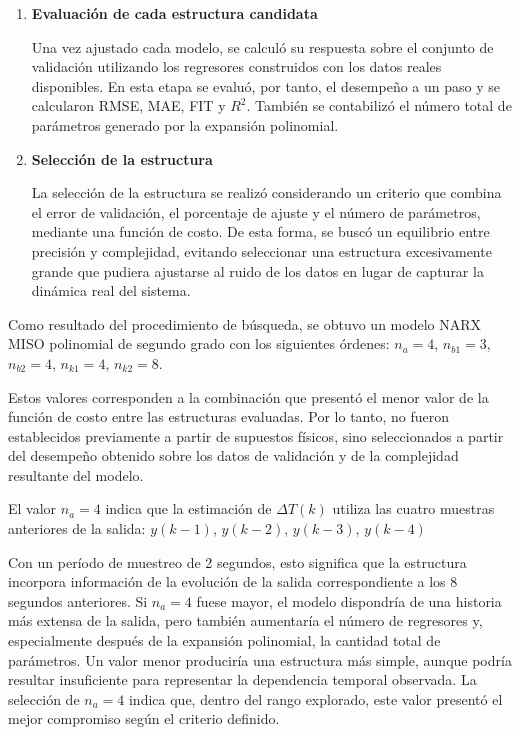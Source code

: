 \documentclass[11pt]{report}
\begin{document}
\begin{enumerate}
\item \textbf{Evaluación de cada estructura candidata}

Una vez ajustado cada modelo, se calculó su respuesta sobre el conjunto de validación utilizando los regresores construidos con los datos reales disponibles. En esta etapa se evaluó, por tanto, el desempeño a un paso y se calcularon RMSE, MAE, FIT y $R^2$. También se contabilizó el número total de parámetros generado por la expansión polinomial.


\item \textbf{Selección de la estructura}

La selección de la estructura se realizó considerando un criterio que combina el error de validación, el porcentaje de ajuste y el número de parámetros, mediante una función de costo. De esta forma, se buscó un equilibrio entre precisión y complejidad, evitando seleccionar una estructura excesivamente grande que pudiera ajustarse al ruido de los datos en lugar de capturar la dinámica real del sistema.

    
\end{enumerate}





Como resultado del procedimiento de búsqueda, se obtuvo un modelo NARX MISO polinomial de segundo grado con los siguientes órdenes: $n_a=4$, $n_{b1}=3$, $n_{b2}=4$, $n_{k1}=4$, $n_{k2}=8$.

Estos valores corresponden a la combinación que presentó el menor valor de la función de costo entre las estructuras evaluadas. Por lo tanto, no fueron establecidos previamente a partir de supuestos físicos, sino seleccionados a partir del desempeño obtenido sobre los datos de validación y de la complejidad resultante del modelo.


El valor $n_a=4$ indica que la estimación de $\Delta T(k)$ utiliza las cuatro muestras anteriores de la salida: $y(k-1)$, $y(k-2)$, $y(k-3)$, $y(k-4)$

Con un período de muestreo de 2 segundos, esto significa que la estructura incorpora información de la evolución de la salida correspondiente a los 8 segundos anteriores. Si $n_a=4$ fuese mayor, el modelo dispondría de una historia más extensa de la salida, pero también aumentaría el número de regresores y, especialmente después de la expansión polinomial, la cantidad total de parámetros. Un valor menor produciría una estructura más simple, aunque podría resultar insuficiente para representar la dependencia temporal observada. La selección de $n_a=4$ indica que, dentro del rango explorado, este valor presentó el mejor compromiso según el criterio definido.
\end{document}
